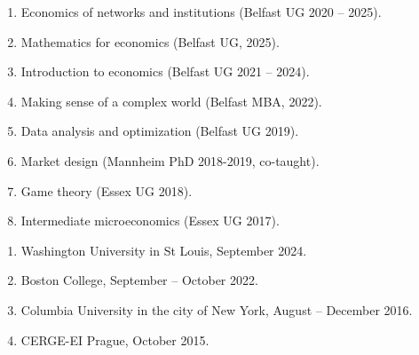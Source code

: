\documentclass[11pt,a4paper]{article}
\begin{document}
\begin{enumerate}[leftmargin=*,noitemsep,partopsep=0pt,topsep=0pt,parsep=0pt, reversed]
	\item Economics of networks and institutions (Belfast UG 2020 -- 2025).
	\item Mathematics for economics (Belfast UG, 2025).
	\item Introduction to economics (Belfast UG 2021 -- 2024).
	\item Making sense of a complex world (Belfast MBA, 2022).
	\item Data analysis and optimization (Belfast UG 2019).
	\item Market design (Mannheim PhD 2018-2019, co-taught).
	\item Game theory (Essex UG 2018).
	\item Intermediate microeconomics (Essex UG 2017).
\end{enumerate}


\begin{enumerate}[leftmargin=*,noitemsep,partopsep=0pt,topsep=0pt,parsep=0pt, reversed]
	\item Washington University in St Louis, September 2024.
	\item Boston College, September – October 2022.
	\item Columbia University in the city of New York, August – December 2016.
	\item CERGE-EI Prague, October 2015.
\end{enumerate}

\end{document}
